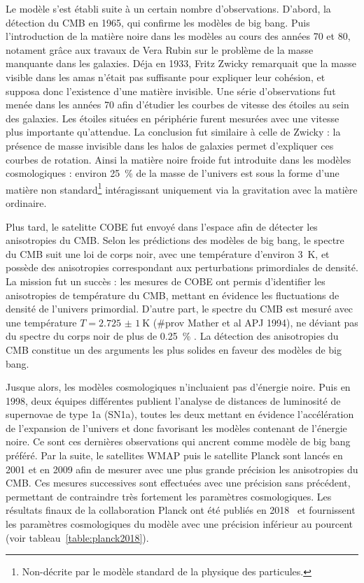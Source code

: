 \documentclass[11pt, twoside, a4paper, openright]{report}
\begin{document}
Le modèle s'est établi suite à un certain nombre d'observations. D'abord, la détection du CMB en 1965, qui confirme les modèles de big bang.
Puis l'introduction de la matière noire dans les modèles au cours des années 70 et 80, notament grâce aux travaux de Vera Rubin sur le problème de la masse manquante dans les galaxies. Déja en 1933, Fritz Zwicky remarquait que la masse visible dans les amas n'était pas suffisante pour expliquer leur cohésion, et supposa donc l'existence d'une matière invisible. Une série d'observations fut menée dans les années 70 afin d'étudier les courbes de vitesse des étoiles au sein des galaxies. Les étoiles situées en périphérie furent mesurées avec une vitesse plus importante qu'attendue. La conclusion fut similaire à celle de Zwicky : la présence de masse invisible dans les halos de galaxies permet d'expliquer ces courbes de rotation. Ainsi la matière noire froide fut introduite dans les modèles cosmologiques : environ \SI{25}{\percent} de la masse de l'univers est sous la forme d'une matière non standard\footnote{Non-décrite par le modèle standard de la physique des particules.} intéragissant uniquement via la gravitation avec la matière ordinaire.

Plus tard, le satelitte COBE fut envoyé dans l'espace afin de détecter les anisotropies du CMB. Selon les prédictions des modèles de big bang, le spectre du CMB suit une loi de corps noir, avec une température d'environ \SI{3}{\kelvin}, et possède des anisotropies correspondant aux perturbations primordiales de densité. La mission fut un succès : les mesures de COBE ont permis d'identifier les anisotropies de température du CMB, mettant en évidence les fluctuations de densité de l'univers primordial. D'autre part, le spectre du CMB est mesuré avec une température $T = \SI{2,725(1)}{\kelvin}$ (\#prov Mather et al APJ 1994), ne déviant pas du spectre du corps noir de plus de \SI{0,25}{\percent} \cite{CITE:https://www.ncbi.nlm.nih.gov/pmc/articles/PMC46596/}. La détection des anisotropies du CMB constitue un des arguments les plus solides en faveur des modèles de big bang.

Jusque alors, les modèles cosmologiques n'incluaient pas d'énergie noire. Puis en 1998, deux équipes différentes publient l'analyse de distances de luminosité de supernovae de type 1a (SN1a), toutes les deux mettant en évidence l'accélération de l'expansion de l'univers et donc favorisant les modèles contenant de l'énergie noire. Ce sont ces dernières observations qui ancrent \lcdm{} comme modèle de big bang préféré. Par la suite, le satellites WMAP puis le satellite Planck sont lancés en 2001 et en 2009 afin de mesurer avec une plus grande précision les anisotropies du CMB. Ces mesures successives sont effectuées avec une précision sans précédent, permettant de contraindre très fortement les paramètres cosmologiques. Les résultats finaux de la collaboration Planck ont été publiés en 2018~\cite{CITE:planck2018} et fournissent les paramètres cosmologiques du modèle \lcdm{} avec une précision inférieur au pourcent (voir tableau~\ref{table:planck2018}).
\end{document}
